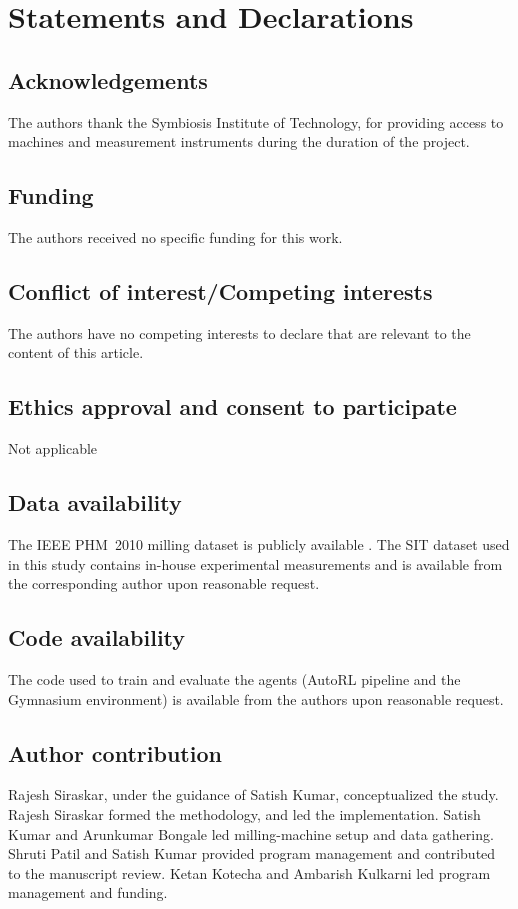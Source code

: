 \documentclass[sn-basic]{sn-jnl}%
\begin{document}
\section*{Statements and Declarations}

\subsection*{Acknowledgements}
The authors thank the Symbiosis Institute of Technology, for providing access to machines and measurement instruments during the duration of the project.

\subsection*{Funding}
The authors received no specific funding for this work.

\subsection*{Conflict of interest/Competing interests}
The authors have no competing interests to declare that are relevant to the content of this article.

\subsection*{Ethics approval and consent to participate}
Not applicable

\subsection*{Data availability}
The IEEE PHM~2010 milling dataset is publicly available \cite{PHMdata2010}. The SIT dataset used in this study contains in-house experimental measurements and is available from the corresponding author upon reasonable request.

\subsection*{Code availability}
The code used to train and evaluate the agents (AutoRL pipeline and the Gymnasium environment) is available from the authors upon reasonable request.

\subsection*{Author contribution}
Rajesh Siraskar, under the guidance of Satish Kumar, conceptualized the study. Rajesh Siraskar formed the methodology, and led the implementation. Satish Kumar and Arunkumar Bongale led milling-machine setup and data gathering. Shruti Patil and Satish Kumar provided program management and contributed to the manuscript review. Ketan Kotecha and Ambarish Kulkarni led program management and funding.
\end{document}
